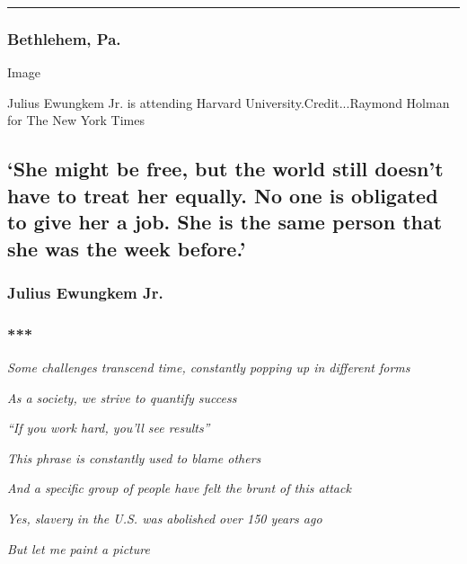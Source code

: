 \begin{center}\rule{0.5\linewidth}{\linethickness}\end{center}

\hypertarget{bethlehem-pa}{%
\subsubsection{Bethlehem, Pa.}\label{bethlehem-pa}}

Image

Julius Ewungkem Jr. is attending Harvard University.Credit...Raymond
Holman for The New York Times

\hypertarget{she-might-be-free-but-the-world-still-doesnt-have-to-treat-her-equally-no-one-is-obligated-to-give-her-a-job-she-is-the-same-person-that-she-was-the-week-before}{%
\subsection{`She might be free, but the world still doesn't have to
treat her equally. No one is obligated to give her a job. She is the
same person that she was the week
before.'}\label{she-might-be-free-but-the-world-still-doesnt-have-to-treat-her-equally-no-one-is-obligated-to-give-her-a-job-she-is-the-same-person-that-she-was-the-week-before}}

\hypertarget{julius-ewungkem-jr}{%
\subsubsection{Julius Ewungkem Jr.}\label{julius-ewungkem-jr}}

\hypertarget{-1}{%
\subsubsection{***}\label{-1}}

\emph{Some challenges transcend time, constantly popping up in different
forms}

\emph{As a society, we strive to quantify success}

\emph{``If you work hard, you'll see results''}

\emph{This phrase is constantly used to blame others}

\emph{And a specific group of people have felt the brunt of this attack}

\emph{Yes, slavery in the U.S. was abolished over 150 years ago}

\emph{But let me paint a picture}

